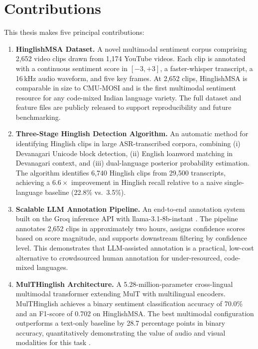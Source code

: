 \section{Contributions}

This thesis makes five principal contributions:

\begin{enumerate}
    \item \textbf{HinglishMSA Dataset.} A novel multimodal sentiment corpus comprising 2{,}652 video clips drawn from 1{,}174 YouTube videos. Each clip is annotated with a continuous sentiment score in $[-3,+3]$, a faster-whisper transcript, a 16\,kHz audio waveform, and five key frames. At 2{,}652 clips, HinglishMSA is comparable in size to CMU-MOSI \cite{zadeh2016mosi} and is the first multimodal sentiment resource for any code-mixed Indian language variety. The full dataset and feature files are publicly released to support reproducibility and future benchmarking.

    \item \textbf{Three-Stage Hinglish Detection Algorithm.} An automatic method for identifying Hinglish clips in large ASR-transcribed corpora, combining (i) Devanagari Unicode block detection, (ii) English loanword matching in Devanagari context, and (iii) dual-language posterior probability estimation. The algorithm identifies 6{,}740 Hinglish clips from 29{,}500 transcripts, achieving a $6.6\times$ improvement in Hinglish recall relative to a naive single-language baseline (22.8\% vs.\ 3.5\%).

    \item \textbf{Scalable LLM Annotation Pipeline.} An end-to-end annotation system built on the Groq inference API with llama-3.1-8b-instant \cite{touvron2023llama}. The pipeline annotates 2{,}652 clips in approximately two hours, assigns confidence scores based on score magnitude, and supports downstream filtering by confidence level. This demonstrates that LLM-assisted annotation is a practical, low-cost alternative to crowdsourced human annotation for under-resourced, code-mixed languages.

    \item \textbf{MulTHinglish Architecture.} A 5.28-million-parameter cross-lingual multimodal transformer extending MulT \cite{tsai2019multimodal} with multilingual encoders. MulTHinglish achieves a binary sentiment classification accuracy of 70.0\% and an F1-score of 0.702 on HinglishMSA. The best multimodal configuration outperforms a text-only baseline by 28.7 percentage points in binary accuracy, quantitatively demonstrating the value of audio and visual modalities for this task \cite{guo2023recent, poria2017review}.


\end{enumerate}
